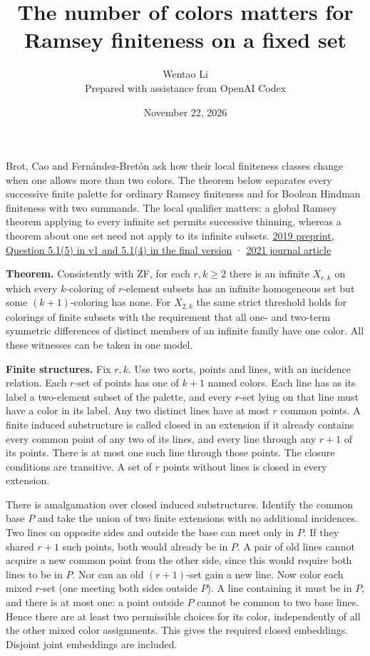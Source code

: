 \documentclass[11pt]{article}
\author{Wentao Li\\\small Prepared with assistance from OpenAI Codex}
\date{November 22, 2026}
\title{The number of colors matters for Ramsey finiteness on a fixed set}
\begin{document}
\maketitle
Brot, Cao and Fernández-Bretón ask how their local finiteness classes change when one allows more than two colors. The theorem below separates every successive finite palette for ordinary Ramsey finiteness and for Boolean Hindman finiteness with two summands. The local qualifier matters: a global Ramsey theorem applying to every infinite set permits successive thinning, whereas a theorem about one set need not apply to its infinite subsets. \href{https://arxiv.org/abs/1910.11025}{2019 preprint, Question 5.1(5) in v1 and 5.1(4) in the final version} · \href{https://doi.org/10.1016/j.apal.2021.102961}{2021 journal article}

\textbf{Theorem.} Consistently with ZF, for each \(r,k\ge2\) there is an infinite \(X_{r,k}\) on which every \(k\)-coloring of \(r\)-element subsets has an infinite homogeneous set but some \((k+1)\)-coloring has none. For \(X_{2,k}\) the same strict threshold holds for colorings of finite subsets with the requirement that all one- and two-term symmetric differences of distinct members of an infinite family have one color. All these witnesses can be taken in one model.

\textbf{Finite structures.} Fix \(r,k\). Use two sorts, points and lines, with an incidence relation. Each \(r\)-set of points has one of \(k+1\) named colors. Each line has as its label a two-element subset of the palette, and every \(r\)-set lying on that line must have a color in its label. Any two distinct lines have at most \(r\) common points. A finite induced substructure is called closed in an extension if it already contains every common point of any two of its lines, and every line through any \(r+1\) of its points. There is at most one such line through those points. The closure conditions are transitive. A set of \(r\) points without lines is closed in every extension.

There is amalgamation over closed induced substructures. Identify the common base \(P\) and take the union of two finite extensions with no additional incidences. Two lines on opposite sides and outside the base can meet only in \(P\). If they shared \(r+1\) such points, both would already be in \(P\). A pair of old lines cannot acquire a new common point from the other side, since this would require both lines to be in \(P\). Nor can an old \((r+1)\)-set gain a new line. Now color each mixed \(r\)-set (one meeting both sides outside \(P\)). A line containing it must be in \(P\), and there is at most one: a point outside \(P\) cannot be common to two base lines. Hence there are at least two permissible choices for its color, independently of all the other mixed color assignments. This gives the required closed embeddings. Disjoint joint embeddings are included.
\end{document}
